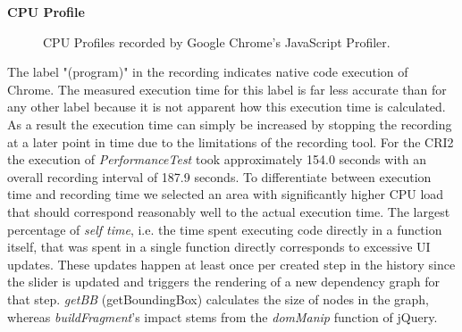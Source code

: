 	\noindent\textbf{CPU Profile}\\
	\begin{figure}[!h]
	\centering
	\hfill
	\caption{CPU Profiles recorded by Google Chrome's JavaScript Profiler.}
	\end{figure}
	The label "(program)" in the recording indicates native code execution of Chrome. The measured execution time for this label is far less accurate than for any other label because it is not apparent how this execution time is calculated. As a result the execution time can simply be increased by stopping the recording at a later point in time due to the limitations of the recording tool.	
	For the CRI2 the execution of \emph{PerformanceTest} took approximately 154.0 seconds with an overall recording interval of 187.9 seconds. To differentiate between execution time and recording time we selected an area with significantly higher CPU load that should correspond reasonably well to the actual execution time. The largest percentage of \emph{self time}, i.e. the time spent executing code directly in a function itself, that was spent in a single function directly corresponds to excessive UI updates. These updates happen at least once per created step in the history since the slider is updated and triggers the rendering of a new dependency graph for that step. \emph{getBB} (getBoundingBox) calculates the size of nodes in the graph, whereas  \emph{buildFragment}'s impact stems from the \emph{domManip} function of jQuery.\\
